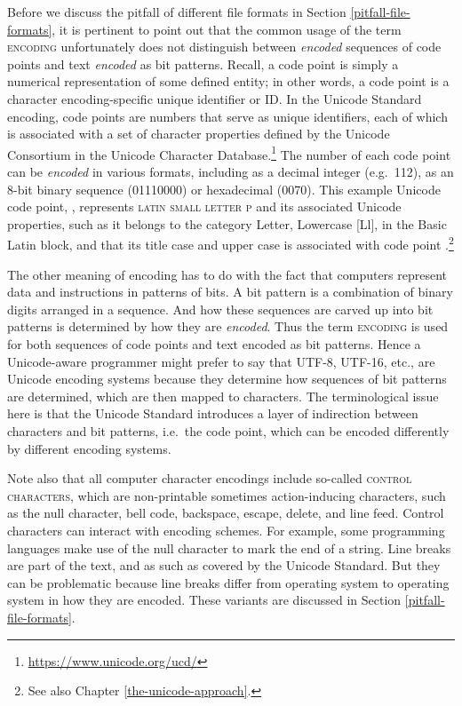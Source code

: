 Before we discuss the pitfall of different file formats in Section \ref{pitfall-file-formats}, it is pertinent to point out that the common usage of the term \textsc{encoding} unfortunately does not distinguish between \textit{encoded} sequences of code points and text \textit{encoded} as bit patterns. Recall, a code point is simply a numerical representation of some defined entity; in other words, a code point is a character encoding-specific unique identifier or ID. In the Unicode Standard encoding, code points are numbers that serve as unique identifiers, each of which is associated with a set of character properties defined by the Unicode Consortium in the Unicode Character Database.\footnote{\url{https://www.unicode.org/ucd/}} The number of each code point can be \textit{encoded} in various formats, including as a decimal integer (e.g.\ 112), as an 8-bit binary sequence (01110000) or hexadecimal (0070). This example Unicode code point, , represents \textsc{latin small letter p} and its associated Unicode properties, such as it belongs to the category Letter, Lowercase [Ll], in the Basic Latin block, and that its title case and upper case is associated with code point .\footnote{See also Chapter \ref{the-unicode-approach}.}


The other meaning of encoding has to do with the fact that computers represent data and instructions in patterns of bits. A bit pattern is a combination of binary digits arranged in a sequence. And how these sequences are carved up into bit patterns is determined by how they are \textit{encoded}. Thus the term \textsc{encoding} is used for both sequences of code points and text encoded as bit patterns. Hence a Unicode-aware programmer might prefer to say that UTF-8, UTF-16, etc., are Unicode encoding systems because they determine how sequences of bit patterns are determined, which are then mapped to characters. The terminological issue here is that the Unicode Standard introduces a layer of indirection between characters and bit patterns, i.e.\ the code point, which can be encoded differently by different encoding systems.

Note also that all computer character encodings include so-called \textsc{control characters}, which are non-printable sometimes action-inducing characters, such as the null character, bell code, backspace, escape, delete, and line feed. Control characters can interact with encoding schemes. For example, some programming languages make use of the null character to mark the end of a string. Line breaks are part of the text, and as such as covered by the Unicode Standard. But they can be problematic because line breaks differ from operating system to operating system in how they are encoded. These variants are discussed in Section \ref{pitfall-file-formats}.

